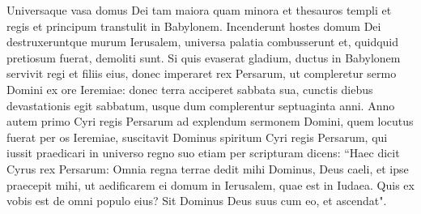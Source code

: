 \begin{biblechapter}
\verse Universaque vasa domus Dei tam maiora quam minora et thesauros templi et regis et principum transtulit in Babylonem. 
\verse Incenderunt hostes domum Dei destruxeruntque murum Ierusalem, universa palatia combusserunt et, quidquid pretiosum fuerat, demoliti sunt. 
\verse Si quis evaserat gladium, ductus in Babylonem servivit regi et filiis eius, donec imperaret rex Persarum, 
\verse ut compleretur sermo Domini ex ore Ieremiae: donec terra acciperet sabbata sua, cunctis diebus devastationis egit sabbatum, usque dum complerentur septuaginta anni. 
\verse Anno autem primo Cyri regis Persarum ad explendum sermonem Domini, quem locutus fuerat per os Ieremiae, suscitavit Dominus spiritum Cyri regis Persarum, qui iussit praedicari in universo regno suo etiam per scripturam dicens: 
\verse “Haec dicit Cyrus rex Persarum: Omnia regna terrae dedit mihi Dominus, Deus caeli, et ipse praecepit mihi, ut aedificarem ei domum in Ierusalem, quae est in Iudaea. Quis ex vobis est de omni populo eius? Sit Dominus Deus suus cum eo, et ascendat".     
\end{biblechapter}
